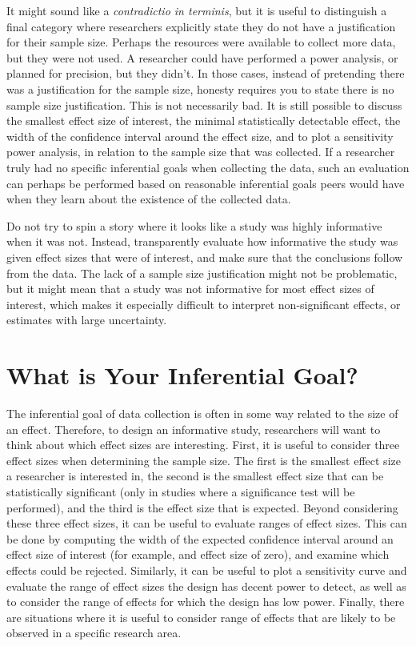 \documentclass[
  english,
  ,jou, a4paper,floatsintext]{apa6}
\begin{document}
It might sound like a \emph{contradictio in terminis}, but it is useful to distinguish a final category where researchers explicitly state they do not have a justification for their sample size. Perhaps the resources were available to collect more data, but they were not used. A researcher could have performed a power analysis, or planned for precision, but they didn't. In those cases, instead of pretending there was a justification for the sample size, honesty requires you to state there is no sample size justification. This is not necessarily bad. It is still possible to discuss the smallest effect size of interest, the minimal statistically detectable effect, the width of the confidence interval around the effect size, and to plot a sensitivity power analysis, in relation to the sample size that was collected. If a researcher truly had no specific inferential goals when collecting the data, such an evaluation can perhaps be performed based on reasonable inferential goals peers would have when they learn about the existence of the collected data.

Do not try to spin a story where it looks like a study was highly informative when it was not. Instead, transparently evaluate how informative the study was given effect sizes that were of interest, and make sure that the conclusions follow from the data. The lack of a sample size justification might not be problematic, but it might mean that a study was not informative for most effect sizes of interest, which makes it especially difficult to interpret non-significant effects, or estimates with large uncertainty.

\hypertarget{what-is-your-inferential-goal}{%
\section{What is Your Inferential Goal?}\label{what-is-your-inferential-goal}}

The inferential goal of data collection is often in some way related to the size of an effect. Therefore, to design an informative study, researchers will want to think about which effect sizes are interesting. First, it is useful to consider three effect sizes when determining the sample size. The first is the smallest effect size a researcher is interested in, the second is the smallest effect size that can be statistically significant (only in studies where a significance test will be performed), and the third is the effect size that is expected. Beyond considering these three effect sizes, it can be useful to evaluate ranges of effect sizes. This can be done by computing the width of the expected confidence interval around an effect size of interest (for example, and effect size of zero), and examine which effects could be rejected. Similarly, it can be useful to plot a sensitivity curve and evaluate the range of effect sizes the design has decent power to detect, as well as to consider the range of effects for which the design has low power. Finally, there are situations where it is useful to consider range of effects that are likely to be observed in a specific research area.
\end{document}
